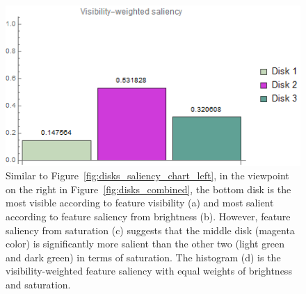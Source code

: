 \begin{figure}
\begin{minipage}{.45\textwidth}
		\subcaption{}
	\end{minipage}~
	\begin{minipage}{.45\textwidth}
		\includegraphics[width=1\linewidth]{images/disk_visibility_saliency_weighted_chart_right}
		\subcaption{}
	\end{minipage}
	\caption[The feature visibility histogram and the visiblity-weighted saliency histograms from the right viewpoint]{Similar to Figure~\ref{fig:disks_saliency_chart_left}, in the viewpoint on the right in Figure~\ref{fig:disks_combined}, the bottom disk is the most visible according to feature visibility (a) and most salient according to feature saliency from brightness (b). However, feature saliency from saturation (c) suggests that the middle disk (magenta color) is significantly more salient than the other two (light green and dark green) in terms of saturation. The histogram (d) is the visibility-weighted feature saliency with equal weights of brightness and saturation.}
	\label{fig:disks_saliency_chart_right}
\end{figure}


